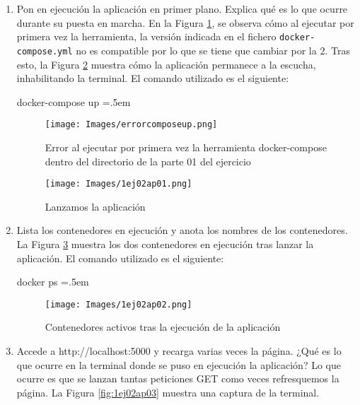 \documentclass[12pt,a4paper]{article}
\newenvironment{lcverbatim}
 {\SaveVerbatim{cverb}}
 {\endSaveVerbatim
  \flushleft\fboxrule=0pt\fboxsep=.5em
  \colorbox{cverbbg}{%
    \makebox[\dimexpr\linewidth-2\fboxsep][l]{\BUseVerbatim{cverb}}%
  }
  \endflushleft
}
\begin{document}
\begin{enumerate}
\item Pon en ejecución la aplicación en primer plano. Explica qué es lo que ocurre durante su
puesta en marcha. En la Figura \ref{fig:errcomposeup}, se observa cómo al ejecutar por primera vez la herramienta, la versión indicada en el fichero \verb|docker-compose.yml| no es compatible por lo que se tiene que cambiar por la 2. Tras esto, la Figura \ref{fig:1ej02ap01} muestra cómo la aplicación permanece a la escucha, inhabilitando la terminal. El comando utilizado es el siguiente:

\begin{lcverbatim}
docker-compose up
\end{lcverbatim}

\begin{figure}[h]
    \centering
    \texttt{[image: Images/errorcomposeup.png]}
    \caption{Error al ejecutar por primera vez la herramienta docker-compose dentro del directorio de la parte 01 del ejercicio}
    \label{fig:errcomposeup}
\end{figure}

\begin{figure}[h]
    \centering
    \texttt{[image: Images/1ej02ap01.png]}
    \caption{Lanzamos la aplicación}
    \label{fig:1ej02ap01}
\end{figure}

\item Lista los contenedores en ejecución y anota los nombres de los contenedores. La Figura \ref{fig:1ej02ap02} muestra los dos contenedores en ejecución tras lanzar la aplicación. El comando utilizado es el siguiente:

\begin{lcverbatim}
docker ps
\end{lcverbatim}

\begin{figure}[h]
    \centering
    \texttt{[image: Images/1ej02ap02.png]}
    \caption{Contenedores activos tras la ejecución de la aplicación}
    \label{fig:1ej02ap02}
\end{figure}

\newpage
\item Accede a http://localhost:5000 y recarga varias veces la página. ¿Qué es lo que ocurre
en la terminal donde se puso en ejecución la aplicación? Lo que ocurre es que se lanzan tantas peticiones GET como veces refresquemos la página. La Figura \ref{fig:1ej02ap03} muestra una captura de la terminal.


\end{enumerate}
\end{document}
